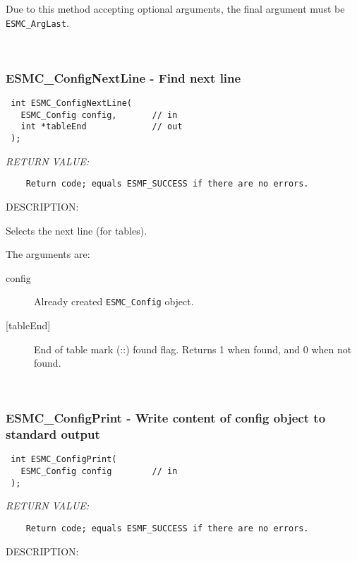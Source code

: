     Due to this method accepting optional arguments, the final argument
    must be {\tt ESMC\_ArgLast}.
   
 
\mbox{}\hrulefill\ 
 
\subsubsection [ESMC\_ConfigNextLine] {ESMC\_ConfigNextLine - Find next line}


  
\begin{verbatim} int ESMC_ConfigNextLine(
   ESMC_Config config,       // in
   int *tableEnd             // out
 );\end{verbatim}{\em RETURN VALUE:}
\begin{verbatim}    Return code; equals ESMF_SUCCESS if there are no errors.\end{verbatim}
{\sf DESCRIPTION:\\ }


    Selects the next line (for tables).
  
     The arguments are:
     \begin{description}
     \item [config]
       Already created {\tt ESMC\_Config} object.
     \item [{[tableEnd]}]
       End of table mark (::) found flag.  Returns 1 when found, and 0 when
       not found.
     \end{description}
   
 
\mbox{}\hrulefill\ 
 
\subsubsection [ESMC\_ConfigPrint] {ESMC\_ConfigPrint - Write content of config object to standard output}


  
\begin{verbatim} int ESMC_ConfigPrint(
   ESMC_Config config        // in
 );\end{verbatim}{\em RETURN VALUE:}
\begin{verbatim}    Return code; equals ESMF_SUCCESS if there are no errors.\end{verbatim}
{\sf DESCRIPTION:\\ }



